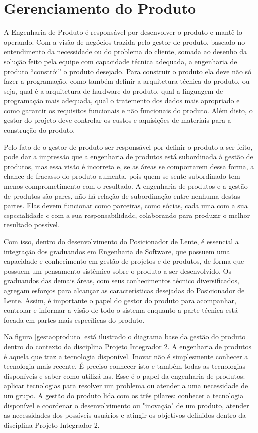 \chapter[Gerenciamento do Produto]{Gerenciamento do Produto}

A Engenharia de Produto é responsável por desenvolver o produto e mantê-lo operando. Com a visão de negócios trazida pelo gestor de produto, baseado no entendimento da necessidade ou do problema do cliente, somada ao desenho da solução feito pela equipe com capacidade técnica adequada, a engenharia de produto “constrói” o produto desejado. Para construir o produto ela deve não só fazer a programação, como também definir a arquitetura técnica do produto, ou seja, qual é a arquitetura de hardware do produto, qual a linguagem de programação mais adequada, qual o tratemento dos dados mais apropriado e como garantir os requisitos funcionais e não funcionais do produto. Além disto, o gestor do projeto deve controlar os custos e aquisições de materiais para a construção do produto. 
 
Pelo fato de o gestor de produto ser responsável por definir o produto a ser feito, pode dar a impressão que a engenharia de produtos está subordinada à gestão de produtos, mas essa visão é incorreta e, se as áreas se comportarem dessa forma, a chance de fracasso do produto aumenta, pois quem se sente subordinado tem menos comprometimento com o resultado. A engenharia de produtos e a gestão de produtos são pares, não há relação de subordinação entre nenhuma destas partes. Elas devem funcionar como parceiras, como sócias, cada uma com a sua especialidade e com a sua responsabilidade, colaborando para produzir o melhor resultado possível.

Com isso, dentro do desenvolvimento do Posicionador de Lente, é essencial a integração dos graduandos em Engenharia de Software, que possuem uma capacidade e conhecimento em gestão de projetos e de produtos, de forma que possuem um pensamento sistêmico sobre o produto a ser desenvolvido. Os graduandos das demais áreas, com seus conhecimentos técnico diversificados, agregam esforços para alcançar as características desejadas do Posicionador de Lente. Assim, é importante o papel do gestor do produto para acompanhar, controlar e informar a visão de todo o sistema enquanto a parte técnica está focada em partes mais específicas do produto.

Na figura \ref{gestaoproduto} está ilustrado o diagrama base da gestão do produto dentro do contexto da disciplina Projeto Integrador 2. A engenharia de produtos é aquela que traz a tecnologia disponível. Inovar não é simplesmente conhecer a tecnologia mais recente. É preciso conhecer isto e também todas as tecnologias disponíveis e saber como utilizá-las. Esse é o papel da engenharia de produtos: aplicar tecnologias para resolver um problema ou atender a uma necessidade de um grupo. A gestão do produto lida com os três pilares: conhecer a tecnologia disponível e coordenar o desenvolvimento ou "inovação" de um produto, atender as necessidades dos possíveis usuários e atingir os objetivos definidos dentro da disciplina Projeto Integrador 2.

